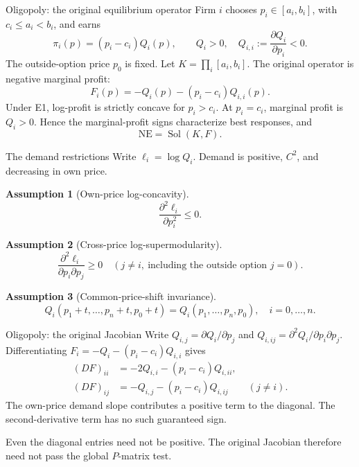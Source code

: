 \documentclass[11pt,aspectratio=169]{beamer}
\theoremstyle{plain}
\theoremstyle{definition}
\newtheorem{assumption}{Assumption}
\DeclareMathOperator{\Sol}{Sol}
\newcommand{\compactmath}{%
 \setlength{\abovedisplayskip}{4pt}\setlength{\belowdisplayskip}{4pt}%
 \setlength{\abovedisplayshortskip}{2pt}\setlength{\belowdisplayshortskip}{4pt}}
\begin{document}
\begin{frame}{Oligopoly: the original equilibrium operator}
\compactmath
Firm $i$ chooses $p_i\in[a_i,b_i]$, with $c_i\leq a_i<b_i$, and earns
\[
 \pi_i(p)=(p_i-c_i)Q_i(p),\qquad Q_i>0,\quad
 Q_{i,i}:=\frac{\partial Q_i}{\partial p_i}<0.
\]
The outside-option price $p_0$ is fixed. Let $K=\prod_i[a_i,b_i]$.
The original operator is negative marginal profit:
\[
 \boxed{F_i(p)=-Q_i(p)-(p_i-c_i)Q_{i,i}(p).}
\]
Under E1, log-profit is strictly concave for $p_i>c_i$.
At $p_i=c_i$, marginal profit is $Q_i>0$.
Hence the marginal-profit signs characterize best responses, and
\[
 \mathrm{NE}=\Sol(K,F).
\]
\end{frame}


\begin{frame}{The demand restrictions}
Write $\ell_i=\log Q_i$. Demand is positive, $C^2$, and decreasing in own price.
\begingroup
\renewcommand{\theassumption}{E\arabic{assumption}}
\setcounter{assumption}{0}
\begin{assumption}[Own-price log-concavity]
\compactmath
 \[
 \frac{\partial^2\ell_i}{\partial p_i^2}\leq0.
 \]
\end{assumption}
\begin{assumption}[Cross-price log-supermodularity]
\compactmath
 \[
 \frac{\partial^2\ell_i}{\partial p_i\partial p_j}\geq0
 \quad(j\ne i,\ \text{including the outside option }j=0).
 \]
\end{assumption}
\begin{assumption}[Common-price-shift invariance]
\compactmath
 \[
 Q_i(p_1+t,\ldots,p_n+t,p_0+t)=Q_i(p_1,\ldots,p_n,p_0),\quad i=0,\ldots,n.
 \]
\end{assumption}
\endgroup
\end{frame}


\begin{frame}{Oligopoly: the original Jacobian}
\compactmath
Write $Q_{i,j}=\partial Q_i/\partial p_j$ and
$Q_{i,ij}=\partial^2Q_i/\partial p_i\partial p_j$.
Differentiating $F_i=-Q_i-(p_i-c_i)Q_{i,i}$ gives
\[
 \boxed{
 \begin{aligned}
 (DF)_{ii}&=-2Q_{i,i}-(p_i-c_i)Q_{i,ii},\\
 (DF)_{ij}&=-Q_{i,j}-(p_i-c_i)Q_{i,ij}\qquad(j\ne i).
 \end{aligned}}
\]
The own-price demand slope contributes a positive term to the diagonal.
The second-derivative term has no such guaranteed sign.
\medskip\par
Even the diagonal entries need not be positive.
The original Jacobian therefore need not pass the global $P$-matrix test.
\end{frame}
\end{document}
